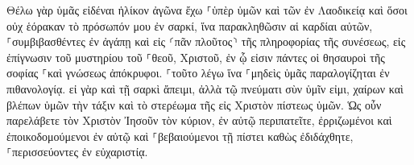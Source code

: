 \documentclass{openreader}
\begin{document}
Θέλω γὰρ ὑμᾶς εἰδέναι ἡλίκον ἀγῶνα ἔχω ⸀ὑπὲρ ὑμῶν καὶ τῶν ἐν Λαοδικείᾳ καὶ ὅσοι οὐχ ἑόρακαν τὸ πρόσωπόν μου ἐν σαρκί, 
ἵνα παρακληθῶσιν αἱ καρδίαι αὐτῶν, ⸀συμβιβασθέντες ἐν ἀγάπῃ καὶ εἰς ⸂πᾶν πλοῦτος⸃ τῆς πληροφορίας τῆς συνέσεως, εἰς ἐπίγνωσιν τοῦ μυστηρίου τοῦ ⸀θεοῦ, Χριστοῦ, 
ἐν ᾧ εἰσιν πάντες οἱ θησαυροὶ τῆς σοφίας ⸀καὶ γνώσεως ἀπόκρυφοι. 
⸀τοῦτο λέγω ἵνα ⸀μηδεὶς ὑμᾶς παραλογίζηται ἐν πιθανολογίᾳ. 
εἰ γὰρ καὶ τῇ σαρκὶ ἄπειμι, ἀλλὰ τῷ πνεύματι σὺν ὑμῖν εἰμι, χαίρων καὶ βλέπων ὑμῶν τὴν τάξιν καὶ τὸ στερέωμα τῆς εἰς Χριστὸν πίστεως ὑμῶν. 
Ὡς οὖν παρελάβετε τὸν Χριστὸν Ἰησοῦν τὸν κύριον, ἐν αὐτῷ περιπατεῖτε, 
ἐρριζωμένοι καὶ ἐποικοδομούμενοι ἐν αὐτῷ καὶ ⸀βεβαιούμενοι τῇ πίστει καθὼς ἐδιδάχθητε, ⸀περισσεύοντες ἐν εὐχαριστίᾳ. 
\end{document}

